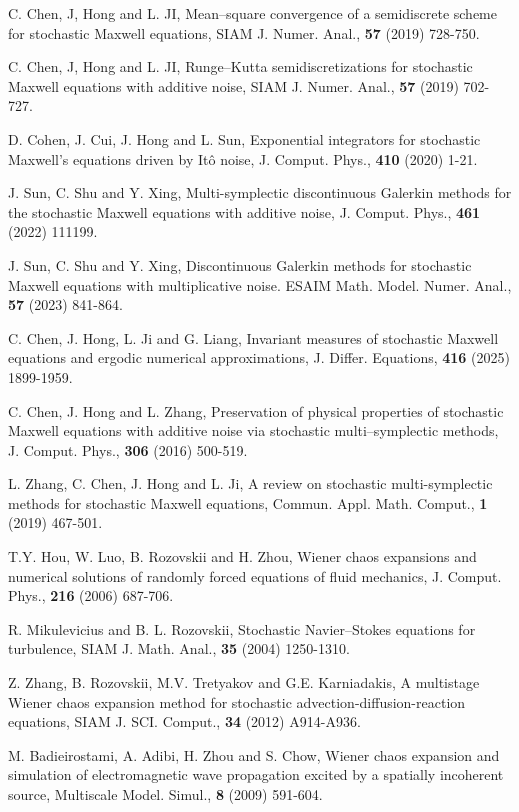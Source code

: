 \documentclass[preprint,12pt]{article}
\numberwithin{figure}{section}
\numberwithin{table}{section}
\numberwithin{equation}{section}
\begin{document}
\begin{thebibliography}{}
C. Chen, J, Hong and L. JI, Mean–square convergence of a semidiscrete scheme for stochastic Maxwell equations, SIAM J. Numer. Anal., \textbf{57} (2019) 728-750.

C. Chen, J, Hong and L. JI, Runge--Kutta semidiscretizations for stochastic Maxwell equations with additive noise, SIAM J. Numer. Anal., \textbf{57} (2019) 702-727.

D. Cohen, J. Cui, J. Hong and L. Sun, Exponential integrators for stochastic Maxwell’s equations driven by It\^o noise, J. Comput. Phys., \textbf{410} (2020) 1-21.

J. Sun, C. Shu and Y. Xing, Multi-symplectic discontinuous Galerkin methods for the stochastic Maxwell equations with additive noise, J. Comput. Phys., \textbf{461} (2022) 111199.

J. Sun, C. Shu and Y. Xing, Discontinuous Galerkin methods for stochastic Maxwell equations
with multiplicative noise. ESAIM Math. Model. Numer. Anal., \textbf{57} (2023) 841-864.
 

C. Chen, J. Hong, L. Ji and G. Liang, Invariant measures of stochastic Maxwell equations and
ergodic numerical approximations, J. Differ. Equations, \textbf{416} (2025) 1899-1959.

C. Chen, J. Hong and L. Zhang, Preservation of physical properties of stochastic Maxwell equations with additive noise via stochastic multi–symplectic methods, J. Comput. Phys., \textbf{306} (2016) 500-519.

L. Zhang, C. Chen, J. Hong and L. Ji, A review on stochastic multi-symplectic methods for stochastic Maxwell equations, Commun. Appl. Math. Comput., \textbf{1} (2019) 467-501.

T.Y. Hou, W. Luo, B. Rozovskii and H. Zhou, Wiener chaos expansions and numerical solutions of randomly forced equations of fluid mechanics, J. Comput. Phys., \textbf{216} (2006) 687-706.

R. Mikulevicius and B. L. Rozovskii, Stochastic Navier--Stokes equations for turbulence, SIAM J. Math. Anal., \textbf{35} (2004) 1250-1310.

Z. Zhang, B. Rozovskii, M.V. Tretyakov and G.E. Karniadakis, A multistage Wiener chaos expansion method for stochastic advection-diffusion-reaction equations, SIAM J. SCI. Comput., \textbf{34} (2012) A914-A936. 

M. Badieirostami, A. Adibi, H. Zhou and S. Chow, Wiener chaos expansion and simulation of electromagnetic wave propagation excited by a spatially incoherent source, Multiscale Model. Simul., \textbf{8} (2009) 591-604.

\end{thebibliography}
\end{document}
